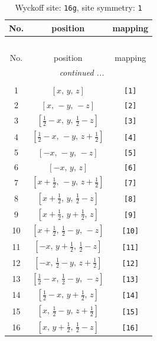 \documentclass[fleqn,8pt]{jsarticle}
\begin{document}
\begin{longtable}{ccc}
\caption{Wyckoff site: {\tt 16g}, site symmetry: {\tt 1}}
 \\
 \hline \hline
No. & position & mapping \\ \hline \endfirsthead

\multicolumn{2}{l}{\tablename\ \thetable{}} \\
 \hline \hline
No. & position & mapping \\ \hline \endhead

 \hline \hline
\multicolumn{2}{r}{\footnotesize\it continued ...} \\ \endfoot

 \hline \hline
\multicolumn{2}{r}{} \\ \endlastfoot

1 & $\left[ x,\, y,\, z \right]$ & {\tt [1]} \\ \hline
2 & $\left[ x,\, - y,\, - z \right]$ & {\tt [2]} \\ \hline
3 & $\left[ \frac{1}{2} - x,\, y,\, \frac{1}{2} - z \right]$ & {\tt [3]} \\ \hline
4 & $\left[ \frac{1}{2} - x,\, - y,\, z + \frac{1}{2} \right]$ & {\tt [4]} \\ \hline
5 & $\left[ - x,\, - y,\, - z \right]$ & {\tt [5]} \\ \hline
6 & $\left[ - x,\, y,\, z \right]$ & {\tt [6]} \\ \hline
7 & $\left[ x + \frac{1}{2},\, - y,\, z + \frac{1}{2} \right]$ & {\tt [7]} \\ \hline
8 & $\left[ x + \frac{1}{2},\, y,\, \frac{1}{2} - z \right]$ & {\tt [8]} \\ \hline
9 & $\left[ x + \frac{1}{2},\, y + \frac{1}{2},\, z \right]$ & {\tt [9]} \\ \hline
10 & $\left[ x + \frac{1}{2},\, \frac{1}{2} - y,\, - z \right]$ & {\tt [10]} \\ \hline
11 & $\left[ - x,\, y + \frac{1}{2},\, \frac{1}{2} - z \right]$ & {\tt [11]} \\ \hline
12 & $\left[ - x,\, \frac{1}{2} - y,\, z + \frac{1}{2} \right]$ & {\tt [12]} \\ \hline
13 & $\left[ \frac{1}{2} - x,\, \frac{1}{2} - y,\, - z \right]$ & {\tt [13]} \\ \hline
14 & $\left[ \frac{1}{2} - x,\, y + \frac{1}{2},\, z \right]$ & {\tt [14]} \\ \hline
15 & $\left[ x,\, \frac{1}{2} - y,\, z + \frac{1}{2} \right]$ & {\tt [15]} \\ \hline
16 & $\left[ x,\, y + \frac{1}{2},\, \frac{1}{2} - z \right]$ & {\tt [16]} \\
\end{longtable}
\end{document}
